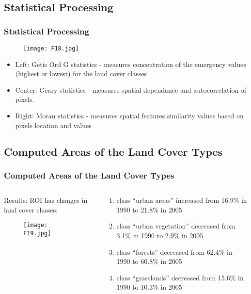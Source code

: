 \documentclass[pdflatex,compress,8pt,
	xcolor={dvipsnames,dvipsnames,svgnames,x11names,table},
	hyperref={colorlinks = true,breaklinks = true, urlcolor = NavyBlue, breaklinks = true}]{beamer}
\begin{document}
\subsection{Statistical Processing}
\begin{frame}\frametitle{Statistical Processing}
\begin{figure}[H]
	\centering
		\texttt{[image: F18.jpg]}
\end{figure}
\begin{itemize}
	\item Left: \alert{Getis Ord G statistics} - measures concentration of the emergency values (highest or lowest) for the land cover classes
	\item Center: \alert{Geary statistics} - measures spatial dependance and autocorrelation of pixels.
	\item Right: \alert{Moran statistics} - measures spatial features similarity values based on pixels location and values
\end{itemize}
\end{frame}

\subsection{Computed Areas of the Land Cover Types}
\begin{frame}\frametitle{Computed Areas of the Land Cover Types}
\begin{minipage}[0.5\textheight]{\textwidth}
\begin{columns}[T]
\begin{column}{0.6\textwidth}
Results: ROI has changes in land cover classes: 
\begin{figure}[H]
	\centering
		\texttt{[image: F19.jpg]}
\end{figure}
\end{column}
\begin{column}{0.4\textwidth}

\begin{enumerate}
	\item class “urban areas” increased from 16.9\% in 1990 to 21.8\% in 2005
	\item class “urban vegetation” decreased from 3.1\% in 1990 to 2.9\% in 2005
	\item class “forests” decreased from 62.4\% in 1990 to 60.8\% in 2005
	\item class “grasslands” decreased from 15.6\% in 1990 to 10.3\% in 2005
\end{enumerate}
\end{column}
\end{columns}
\end{minipage}
\end{frame}
\end{document}
